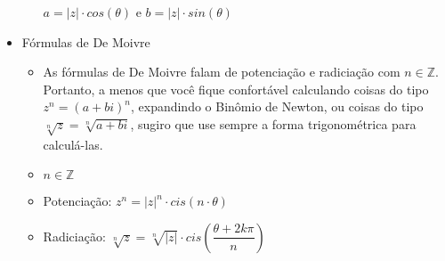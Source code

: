 \documentclass[a4paper, 12pt]{article}
\begin{document}
\begin{itemize}
\begin{itemize}
$ a = |z| \cdot cos(\theta) $ e $ b = |z| \cdot sin(\theta) $
	
	\end{itemize}


\item Fórmulas de De Moivre

	\begin{itemize}

\item As fórmulas de De Moivre falam de potenciação e radiciação com $n \in \mathbb{Z}$. Portanto, a menos que você fique confortável calculando coisas do tipo $z^n = (a + bi)^n$, expandindo o Binômio de Newton, ou coisas do tipo $\sqrt[n]{z} = \sqrt[n]{a + bi}$, sugiro que use sempre a forma trigonométrica para calculá-las.

\item $n \in \mathbb{Z}$

\item Potenciação: $ z^n = |z|^n \cdot cis(n\cdot\theta)$

\item Radiciação: $ \sqrt[n]{z} = \sqrt[n]{|z|} \cdot cis( \dfrac{\theta + 2k\pi}{n} ) $
	
	
	\end{itemize}

\end{itemize}
\end{document}
